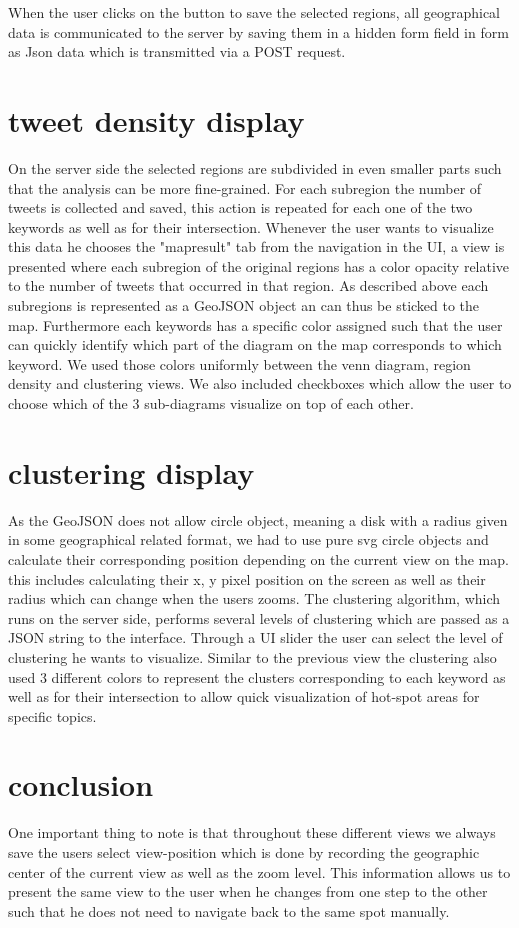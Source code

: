 When the user clicks on the button to save the selected regions, all geographical data is communicated to the server by saving them in a hidden form field in form as Json data which is transmitted via a POST request.


\section{tweet density display}

On the server side the selected regions are subdivided in even smaller parts such that the analysis can be more fine-grained. For each subregion the number of tweets is collected and saved, this action is repeated for each one of the two keywords as well as for their intersection.
Whenever the user wants to visualize this data he chooses the "mapresult" tab from the navigation in the UI, a view is presented where each subregion of the original regions has a color opacity relative to the number of tweets that occurred in that region. As described above each subregions is represented as a GeoJSON object an can thus be sticked to the map. Furthermore each keywords has a specific color assigned such that the user can quickly identify which part of the diagram on the map corresponds to which keyword. We used those colors uniformly between the venn diagram, region density and clustering views. We also included checkboxes which allow the user to choose which of the 3 sub-diagrams visualize on top of each other.


\section{clustering display}

As the GeoJSON does not allow circle object, meaning a disk with a radius given in some geographical related format, we had to use pure svg circle objects and calculate their corresponding position depending on the current view on the map. this includes calculating their x, y pixel position on the screen as well as their radius which can change when the users zooms. The clustering algorithm, which runs on the server side, performs several levels of clustering which are passed as a JSON string to the interface. Through a UI slider the user can select the level of clustering he wants to visualize. Similar to the previous view the clustering also used 3 different colors to represent the clusters corresponding to each keyword as well as for their intersection to allow quick visualization of hot-spot areas for specific topics.

\section{conclusion}
One important thing to note is that throughout these different views we always save the users select view-position which is done by recording the geographic center of the current view as well as the zoom level. This information allows us to present the same view to the user when he changes from one step to the other such that he does not need to navigate back to the same spot manually.
